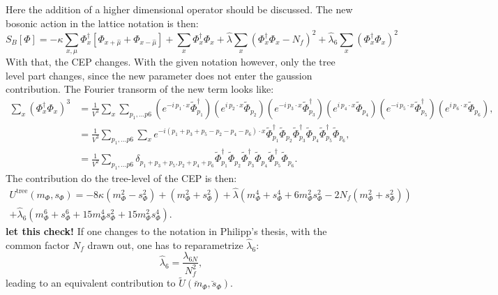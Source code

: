 Here the addition of a higher dimensional operator should be discussed. The new bosonic action in the lattice notation is then:
\begin{equation}\label{eq:bosonicLatticeActionWithLambda_6}
 S_B[\Phi]  = -\kappa \sum\limits_{x,\mu} \Phi_x^{\dagger} \left[\Phi_{x+\hat\mu} + \Phi_{x-\hat\mu} \right] 
              + \sum\limits_x \Phi_x^{\dagger} \Phi_x 
              + \hat{\lambda} \sum\limits_x \left( \Phi_x^{\dagger} \Phi_x - N_f\right)^2 + \hat \lambda_6 \sum\limits_x \left( \Phi_x^{\dagger} \Phi_x \right)^2
\end{equation}
With that, the CEP changes. With the given notation however, only the tree level part changes, since the new parameter does not enter the gaussion contribution.
The Fourier transorm of the new term looks like:
\begin{align}
 \sum\limits_{x} \left( \Phi_x^{\dagger} \Phi_x \right)^3 &= 
                     \frac{1}{V^3}  \sum\limits_{x}  \sum\limits_{p_1,\dots p6}  
                     \left( e^{-i\, p_1 \cdot x}  \tilde\Phi_{p_1}^{\dagger} \right) \left( e^{i\, p_2 \cdot x}  \tilde\Phi_{p_2} \right)
                     \left( e^{-i\, p_3 \cdot x}  \tilde\Phi_{p_3}^{\dagger} \right) \left( e^{i\, p_4 \cdot x}  \tilde\Phi_{p_4} \right)
                     \left( e^{-i\, p_5 \cdot x}  \tilde\Phi_{p_5}^{\dagger} \right) \left( e^{i\, p_6 \cdot x}  \tilde\Phi_{p_6} \right), \nonumber \\
                  &= \frac{1}{V^3}  \sum\limits_{p_1,\dots p6} 
                     \sum\limits_{x}  e^{ -i (p_1 + p_3 + p_5 - p_2 - p_4 - p_6) \cdot x }  
                     \tilde\Phi_{p_1}^{\dagger} \tilde\Phi_{p_2} \tilde\Phi_{p_3}^{\dagger} \tilde\Phi_{p_4} \tilde\Phi_{p_5}^{\dagger} \tilde\Phi_{p_6},
                     \nonumber \\
                  &= \frac{1}{V^2}\sum\limits_{p_1,\dots p6} \delta_{p_1 + p_3 + p_5, p_2 + p_4 + p_6} 
                     \tilde\Phi_{p_1}^{\dagger} \tilde\Phi_{p_2} \tilde\Phi_{p_3}^{\dagger} \tilde\Phi_{p_4} \tilde\Phi_{p_5}^{\dagger} \tilde\Phi_{p_6}
                      \label{eq:FourierTrafoPhiToTheSix}.
\end{align}
The contribution do the tree-level of the CEP is then:
\begin{multline}\label{eq:CEP_tree_level_Contribution_from_lambda_6}
 U^{\text{tree}}(m_{\Phi},s_{\Phi}) = -8 \kappa \left( m_{\Phi}^2 - s_{\Phi}^2 \right)   +   \left( m_{\Phi}^2 + s_{\Phi}^2 \right) 
                         + \hat\lambda \left( m_{\Phi}^4 + s_{\Phi}^4 + 6 m_{\Phi}^2 s_{\Phi}^2 - 2 N_f \left(m_{\Phi}^2 + s_{\Phi}^2 \right) \right) \\
                         + \hat\lambda_6 \left( m_{\Phi}^6 + s_{\Phi}^6 + 15 m_{\Phi}^4 s_{\Phi}^2 + 15 m_{\Phi}^2 s_{\Phi}^4\right).
\end{multline}
\textbf{let this check!}
If one changes to the notation in Philipp's thesis, with the common factor $N_f$ drawn out, one has to reparametrize $\hat\lambda_6$:
\begin{equation}\label{eq:lambda_6_reparametrized}
 \hat \lambda_6 = \frac{\lambda_{6N}}{N_f^2},
\end{equation}
leading to an equivalent contribution to $\tilde U(\breve{m}_{\Phi},\breve{s}_{\Phi})$.


